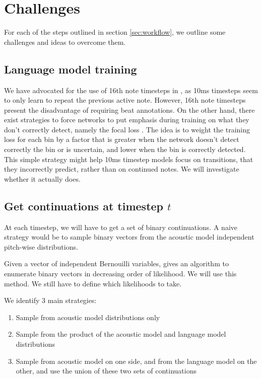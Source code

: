 \documentclass{article}
\begin{document}
\section{Challenges}

For each of the steps outlined in section \ref{sec:workflow}, we outline some challenges and ideas to overcome them.

\subsection{Language model training}
\label{sec:focalloss}

We have advocated for the use of 16th note timesteps in \citep{Ycart2017}, as 10ms timesteps seem to only learn to repeat the previous active note.
However, 16th note timesteps present the disadvantage of requiring beat annotations.
On the other hand, there exist strategies to force networks to put emphasis during training on what they don't correctly detect, namely the focal loss \citep{lin2018focal}.
The idea is to weight the training loss for each bin by a factor that is greater when the network doesn't detect correctly the bin or is uncertain, and lower when the bin is correctly detected.
This simple strategy might help 10ms timestep models focus on transitions, that they incorrectly predict, rather than on continued notes.
We will investigate whether it actually does.

\subsection{Get continuations at timestep $t$}
\label{sec:sampling}

At each timestep, we will have to get a set of binary continuations.
A naive strategy would be to sample binary vectors from the acoustic model independent pitch-wise distributions.

Given a vector of independent Bernouilli variables, \citep{Boulanger-Lewandowski2013} gives an algorithm to enumerate binary vectors in decreasing order of likelihood.
We will use this method.
We still have to define which likelihoods to take.

We identify 3 main strategies:

\begin{enumerate}
\item Sample from acoustic model distributions only
\item Sample from the product of the acoustic model and language model distributions
\item Sample from acoustic model on one side, and from the language model on the other, and use the union of these two sets of continuations
\end{enumerate}
\end{document}
